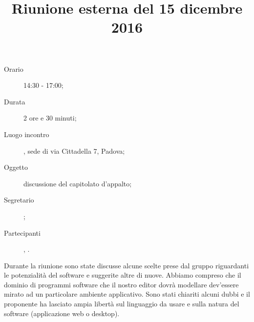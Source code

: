 


\author{\PB}
\supervisor{\MM}
\title{Riunione esterna del 15 dicembre 2016}



\maketitle

\begin{description}
	\item[Orario] 14:30 - 17:00;
	\item[Durata] 2 ore e 30 minuti;
	\item[Luogo incontro] \ZU, sede di via Cittadella 7, Padova;
	\item[Oggetto] discussione del capitolato d'appalto;
	\item[Segretario] \LS; 
	\item[Partecipanti] \GP, \ALL.
\end{description}

Durante la riunione sono state discusse alcune scelte prese dal gruppo riguardanti le potenzialità del software e suggerite altre di nuove. Abbiamo compreso che il dominio di programmi software che il nostro editor dovrà modellare dev'essere mirato ad un particolare ambiente applicativo. Sono stati chiariti alcuni dubbi e il proponente ha lasciato ampia libertà sul linguaggio da usare e sulla natura del software (applicazione web o desktop).


